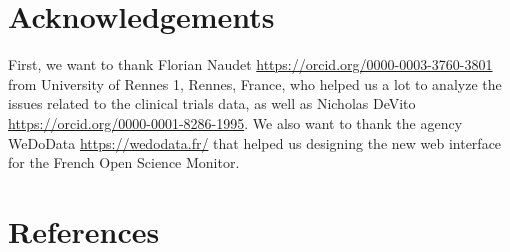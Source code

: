 \documentclass[
]{article}
\begin{document}
\hypertarget{acknowledgements}{%
\section{Acknowledgements}\label{acknowledgements}}

First, we want to thank Florian Naudet
\url{https://orcid.org/0000-0003-3760-3801} from University of Rennes 1,
Rennes, France, who helped us a lot to analyze the issues related to the
clinical trials data, as well as Nicholas DeVito
\url{https://orcid.org/0000-0001-8286-1995}. We also want to thank the
agency WeDoData \url{https://wedodata.fr/} that helped us designing the
new web interface for the French Open Science Monitor.

\hypertarget{references}{%
\section*{References}\label{references}}
\end{document}
